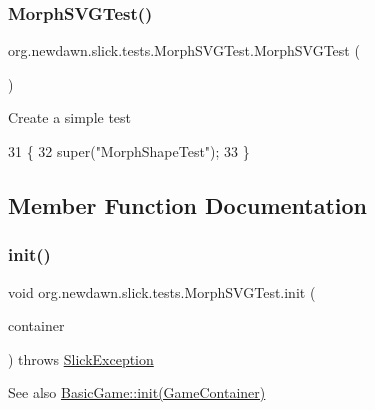 \subsubsection{\texorpdfstring{Morph\+S\+V\+G\+Test()}{MorphSVGTest()}}
{\footnotesize\ttfamily org.\+newdawn.\+slick.\+tests.\+Morph\+S\+V\+G\+Test.\+Morph\+S\+V\+G\+Test (\begin{DoxyParamCaption}{ }\end{DoxyParamCaption})\hspace{0.3cm}{\ttfamily [inline]}}

Create a simple test 
\begin{DoxyCode}
31                           \{
32         super(\textcolor{stringliteral}{"MorphShapeTest"});
33     \}
\end{DoxyCode}


\subsection{Member Function Documentation}
\mbox{\label{classorg_1_1newdawn_1_1slick_1_1tests_1_1_morph_s_v_g_test_ab88e4df732664e1f4c61763b27bfe331}} 
\subsubsection{\texorpdfstring{init()}{init()}}
{\footnotesize\ttfamily void org.\+newdawn.\+slick.\+tests.\+Morph\+S\+V\+G\+Test.\+init (\begin{DoxyParamCaption}\item[{\mbox{\hyperlink{classorg_1_1newdawn_1_1slick_1_1_game_container}{Game\+Container}}}]{container }\end{DoxyParamCaption}) throws \mbox{\hyperlink{classorg_1_1newdawn_1_1slick_1_1_slick_exception}{Slick\+Exception}}\hspace{0.3cm}{\ttfamily [inline]}}

\begin{DoxySeeAlso}{See also}
\mbox{\hyperlink{classorg_1_1newdawn_1_1slick_1_1_basic_game_a8af0900217e4d389249f71367b22d114}{Basic\+Game\+::init(\+Game\+Container)}} 
\end{DoxySeeAlso}


